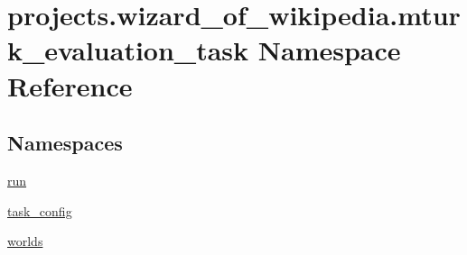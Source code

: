 \hypertarget{namespaceprojects_1_1wizard__of__wikipedia_1_1mturk__evaluation__task}{}\section{projects.\+wizard\+\_\+of\+\_\+wikipedia.\+mturk\+\_\+evaluation\+\_\+task Namespace Reference}
\label{namespaceprojects_1_1wizard__of__wikipedia_1_1mturk__evaluation__task}
\subsection*{Namespaces}
\begin{DoxyCompactItemize}
\item 
 \hyperlink{namespaceprojects_1_1wizard__of__wikipedia_1_1mturk__evaluation__task_1_1run}{run}
\item 
 \hyperlink{namespaceprojects_1_1wizard__of__wikipedia_1_1mturk__evaluation__task_1_1task__config}{task\+\_\+config}
\item 
 \hyperlink{namespaceprojects_1_1wizard__of__wikipedia_1_1mturk__evaluation__task_1_1worlds}{worlds}
\end{DoxyCompactItemize}
